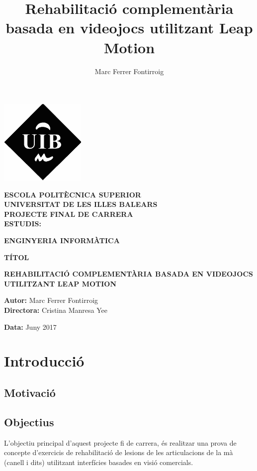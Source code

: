 \documentclass[12pt,a4paper,catalan]{article}
\author{Marc Ferrer Fontirroig}
\title{Rehabilitació complementària basada en videojocs utilitzant Leap Motion}
\begin{document}
	\thispagestyle{empty}
	\begin{center}
		\includegraphics{uib-logo.jpg}
	\end{center}
	\begin{center}
		\textbf{ESCOLA POLITÈCNICA SUPERIOR}\\
		\textbf{UNIVERSITAT DE LES ILLES BALEARS}\\
		\vspace{2em}
		\textbf{PROJECTE FINAL DE CARRERA}\\
		\vspace{1.5em}
		\textbf{ESTUDIS:}
		\begin{framed}
			\textbf{ENGINYERIA INFORMÀTICA}
		\end{framed}
		\textbf{TÍTOL}
		\begin{framed}
			\textbf{REHABILITACIÓ COMPLEMENTÀRIA BASADA EN VIDEOJOCS UTILITZANT LEAP MOTION}
		\end{framed}
		\vspace{1.7em}
	\end{center}
	\begin{flushright}
		\textbf{Autor:} Marc Ferrer Fontirroig\\
		\textbf{Directora:} Cristina Manresa Yee\\
	\end{flushright}
	\textbf{Data:} Juny 2017
	\newpage
	\tableofcontents
	\newpage
	\listoffigures
	\newpage
	\section{Introducció}
	\subsection{Motivació}
	\subsection{Objectius}
	L'objectiu principal d'aquest projecte fi de carrera, és realitzar una prova de concepte d'exercicis de rehabilitació de lesions de les articulacions de la mà (canell i dits) utilitzant interfícies basades en visió comercials.
	
\end{document}
